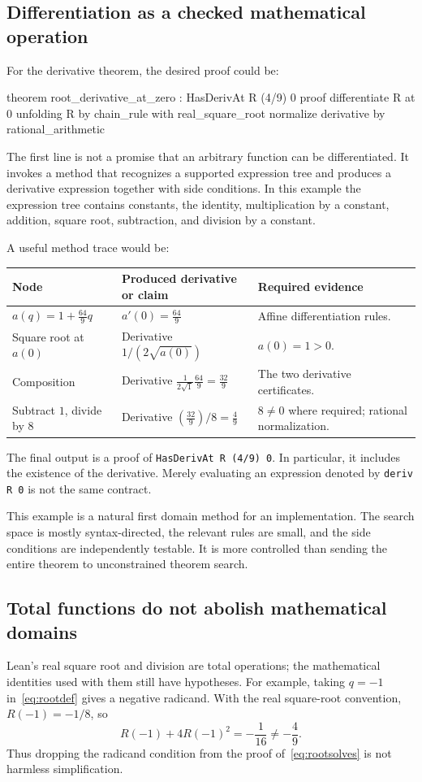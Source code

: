 \documentclass[11pt,a4paper]{article}
\theoremstyle{remark}
\newcommand{\ty}[1]{\texttt{#1}}
\begin{document}
\subsection{Differentiation as a checked mathematical operation}
For the derivative theorem, the desired proof could be:
\Needspace{82pt}
\begin{code}
theorem root_derivative_at_zero : HasDerivAt R (4/9) 0
proof
  differentiate R at 0 unfolding R
    by chain_rule with real_square_root
  normalize derivative by rational_arithmetic
\end{code}
The first line is not a promise that an arbitrary function can be differentiated. It invokes a method that recognizes a supported expression tree and produces a derivative expression together with side conditions. In this example the expression tree contains constants, the identity, multiplication by a constant, addition, square root, subtraction, and division by a constant.

A useful method trace would be:
\begin{longtable}{@{}L{.27\linewidth}L{.40\linewidth}L{.27\linewidth}@{}}
\toprule
Node & Produced derivative or claim & Required evidence\\
\midrule
\endhead
$a(q)=1+\frac{64}{9}q$ & $a'(0)=\frac{64}{9}$ & Affine differentiation rules.\\[3pt]
Square root at $a(0)$ & Derivative $1/(2\sqrt{a(0)})$ & $a(0)=1>0$.\\[3pt]
Composition & Derivative $\frac{1}{2\sqrt1}\frac{64}{9}=\frac{32}{9}$ & The two derivative certificates.\\[3pt]
Subtract $1$, divide by $8$ & Derivative $(\frac{32}{9})/8=\frac49$ & $8\neq0$ where required; rational normalization.\\
\bottomrule
\end{longtable}
The final output is a proof of \ty{HasDerivAt R (4/9) 0}. In particular, it includes the existence of the derivative. Merely evaluating an expression denoted by \ty{deriv R 0} is not the same contract.

This example is a natural first domain method for an implementation. The search space is mostly syntax-directed, the relevant rules are small, and the side conditions are independently testable. It is more controlled than sending the entire theorem to unconstrained theorem search.

\subsection{Total functions do not abolish mathematical domains}
Lean's real square root and division are total operations; the mathematical identities used with them still have hypotheses.\cite{mathlib-sqrt} For example, taking $q=-1$ in~\eqref{eq:rootdef} gives a negative radicand. With the real square-root convention, $R(-1)=-1/8$, so
\[
R(-1)+4R(-1)^2=-\frac1{16}\neq-\frac49.
\]
Thus dropping the radicand condition from the proof of~\eqref{eq:rootsolves} is not harmless simplification.
\end{document}
